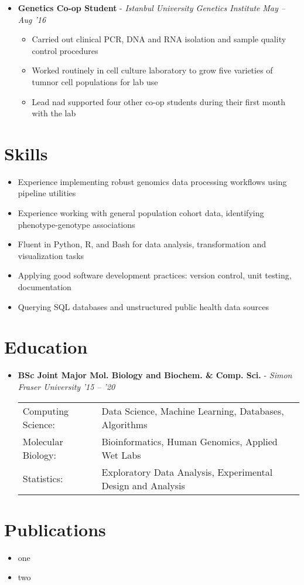 \documentclass{article}
\newcommand{\experienceheader}[3]{\item \textbf{#1} - \textit{#2} \hfill \textit{#3} \vspace{-.2em}}
\newcommand{\customsection}[1]{\section*{#1} \vspace{-1em} \hrulefill \vspace{-.5em}}
\begin{document}
\begin{itemize}
\begin{itemize}
    \end{itemize}
  \experienceheader{Genetics Co-op Student}{Istanbul University Genetics Institute}{May -- Aug '16}
    \begin{itemize}
      \item Carried out clinical PCR, DNA and RNA isolation and sample quality control procedures
      \item Worked routinely in cell culture laboratory to grow five varieties of tumnor cell populations for lab use
      \item Lead nad supported four other co-op students during their first month with the lab
    \end{itemize}
\end{itemize}

\customsection{Skills}
\begin{itemize}
  \item Experience implementing robust genomics data processing workflows using pipeline utilities
  \item Experience working with general population cohort data, identifying phenotype-genotype associations
  \item Fluent in Python, R, and Bash for data analysis, transformation and visualization tasks
  \item Applying good software development practices: version control, unit testing, documentation
  \item Querying SQL databases and unstructured public health data sources
\end{itemize}

\customsection{Education}
\begin{itemize}
\experienceheader{BSc Joint Major Mol. Biology and Biochem. \& Comp. Sci.}{Simon Fraser University}{'15 -- '20}
\begin{tabular}{ l l }
    Computing Science: & Data Science, Machine Learning, Databases, Algorithms \\
    Molecular Biology: & Bioinformatics, Human Genomics, Applied Wet Labs \\
    Statistics: & Exploratory Data Analysis, Experimental Design and Analysis
  \end{tabular}
\end{itemize}

\customsection{Publications}
\begin{itemize}
  \item one
  \item two
\end{itemize}
\end{document}
